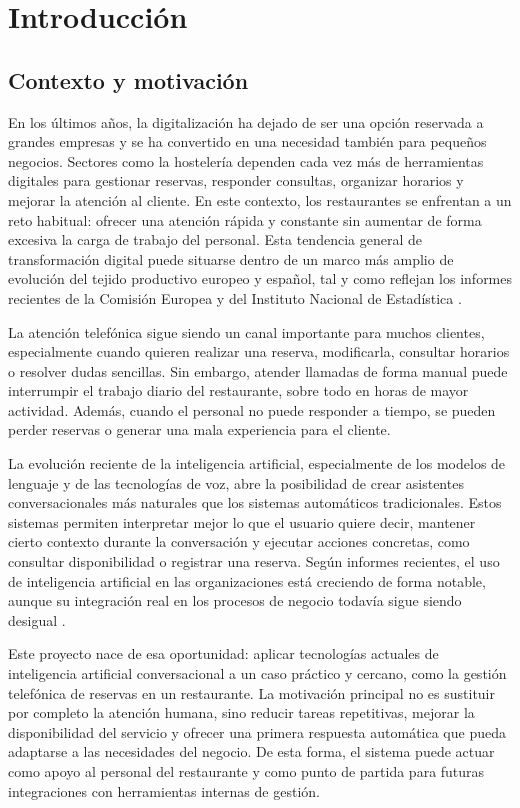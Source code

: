 \chapter{\textbf{Introducción}}
\label{ch:Intro}
\thispagestyle{fancy}

\section{Contexto y motivación}
\label{sec:contexto_motivacion}

En los últimos años, la digitalización ha dejado de ser una opción reservada a grandes empresas y se ha convertido en una necesidad también para pequeños negocios. Sectores como la hostelería dependen cada vez más de herramientas digitales para gestionar reservas, responder consultas, organizar horarios y mejorar la atención al cliente. En este contexto, los restaurantes se enfrentan a un reto habitual: ofrecer una atención rápida y constante sin aumentar de forma excesiva la carga de trabajo del personal. Esta tendencia general de transformación digital puede situarse dentro de un marco más amplio de evolución del tejido productivo europeo y español, tal y como reflejan los informes recientes de la Comisión Europea y del Instituto Nacional de Estadística \cite{CE2024DigitalDecade,INE2025TIC}.

La atención telefónica sigue siendo un canal importante para muchos clientes, especialmente cuando quieren realizar una reserva, modificarla, consultar horarios o resolver dudas sencillas. Sin embargo, atender llamadas de forma manual puede interrumpir el trabajo diario del restaurante, sobre todo en horas de mayor actividad. Además, cuando el personal no puede responder a tiempo, se pueden perder reservas o generar una mala experiencia para el cliente.

La evolución reciente de la inteligencia artificial, especialmente de los modelos de lenguaje y de las tecnologías de voz, abre la posibilidad de crear asistentes conversacionales más naturales que los sistemas automáticos tradicionales. Estos sistemas permiten interpretar mejor lo que el usuario quiere decir, mantener cierto contexto durante la conversación y ejecutar acciones concretas, como consultar disponibilidad o registrar una reserva. Según informes recientes, el uso de inteligencia artificial en las organizaciones está creciendo de forma notable, aunque su integración real en los procesos de negocio todavía sigue siendo desigual \cite{McKinsey2025StateAI}.

Este proyecto nace de esa oportunidad: aplicar tecnologías actuales de inteligencia artificial conversacional a un caso práctico y cercano, como la gestión telefónica de reservas en un restaurante. La motivación principal no es sustituir por completo la atención humana, sino reducir tareas repetitivas, mejorar la disponibilidad del servicio y ofrecer una primera respuesta automática que pueda adaptarse a las necesidades del negocio. De esta forma, el sistema puede actuar como apoyo al personal del restaurante y como punto de partida para futuras integraciones con herramientas internas de gestión.


